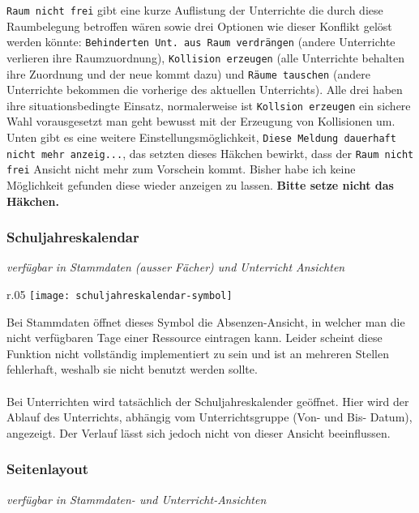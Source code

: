 \noindent
\texttt{Raum nicht frei} gibt eine kurze Auflistung der Unterrichte die durch diese Raumbelegung betroffen wären sowie drei Optionen wie dieser Konflikt gelöst werden könnte: \texttt{Behinderten Unt. aus Raum verdrängen} (andere Unterrichte verlieren ihre Raumzuordnung), \texttt{Kollision erzeugen} (alle Unterrichte behalten ihre Zuordnung und der neue kommt dazu) und \texttt{Räume tauschen} (andere Unterrichte bekommen die vorherige des aktuellen Unterrichts). Alle drei haben ihre situationsbedingte Einsatz, normalerweise ist \texttt{Kollsion erzeugen} ein sichere Wahl vorausgesetzt man geht bewusst mit der Erzeugung von Kollisionen um. Unten gibt es eine weitere Einstellungsmöglichkeit, \texttt{Diese Meldung dauerhaft nicht mehr anzeig...}, das setzten dieses Häkchen bewirkt, dass der \texttt{Raum nicht frei} Ansicht nicht mehr zum Vorschein kommt. Bisher habe ich keine Möglichkeit gefunden diese wieder anzeigen zu lassen. \textbf{Bitte setze nicht das Häkchen.}

\subsubsection{Schuljahreskalendar}
{\small\textit{verfügbar in Stammdaten (ausser Fächer) und Unterricht Ansichten\\}\par}

\begin{wrapfigure}{r}{.05\textwidth}
	\vspace{-50pt}
	\texttt{[image: schuljahreskalendar-symbol]}
	\vspace{-35pt}
\end{wrapfigure}

\noindent
Bei Stammdaten öffnet dieses Symbol die Absenzen-Ansicht, in welcher man die nicht verfügbaren Tage einer Ressource eintragen kann. Leider scheint diese Funktion nicht vollständig implementiert zu sein und ist an mehreren Stellen fehlerhaft, weshalb sie nicht benutzt werden sollte.\\
\\
Bei Unterrichten wird tatsächlich der Schuljahreskalender geöffnet. Hier wird der Ablauf des Unterrichts, abhängig vom Unterrichtsgruppe (Von- und Bis- Datum), angezeigt. Der Verlauf lässt sich jedoch nicht von dieser Ansicht beeinflussen.\\

\subsubsection{Seitenlayout}
{\small\textit{verfügbar in Stammdaten- und Unterricht-Ansichten\\}\par}


